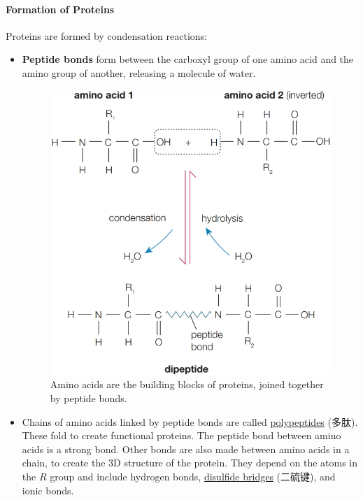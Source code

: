 \paragraph{Formation of Proteins}
Proteins are formed by condensation reactions:
\begin{itemize}
    \item \textbf{Peptide bonds} form between the carboxyl group of one amino acid and the amino group of another, releasing a
    molecule of water.
    \begin{figure}[H]
        \centering
        \includegraphics[scale=0.35]{Biology/1A/Images/1A-5-2.png}
        \caption{Amino acids are the building blocks of proteins, joined together by peptide bonds.}
    \end{figure}
    \item Chains of amino acids linked by peptide bonds are called \underline{polypeptides} (多肽). These fold to create
    functional proteins. The peptide bond between amino acids is a strong bond. Other bonds are also made between amino acids in
    a chain, to create the 3D structure of the protein. They depend on the atoms in the $R$ group and include hydrogen bonds,
    \underline{disulfide bridges} (二硫键), and ionic bonds.
    \begin{figure}[H]
        \centering

\end{figure}
\end{itemize}
